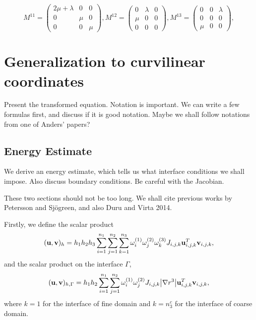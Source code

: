 \documentclass[a4paper]{article}
\begin{document}
\[ M^{11} = \left(\begin{array}{ccc}
2\mu+\lambda & 0 & 0\\
0 & \mu & 0\\
0 & 0 & \mu\end{array}\right), M^{12} = \left(\begin{array}{ccc}
0 & \lambda & 0\\
\mu & 0 & 0\\
0 & 0 & 0\end{array}\right), M^{13} = \left(\begin{array}{ccc}
0 & 0 & \lambda\\
0 & 0 & 0\\
\mu & 0 & 0\end{array}\right),\]


\section{Generalization to curvilinear coordinates}
Present the transformed equation. Notation is important. We can write a few formulas first, and discuss if it is good notation. Maybe we shall follow notations from one of Anders' papers?

\subsection{Energy Estimate}
We derive an energy estimate, which tells us what interface conditions we shall impose. Also discuss boundary conditions. Be careful with the Jacobian.

These two sections should not be too long. We shall cite previous works by Petersson and Sjögreen, and also Duru and Virta 2014. 

Firstly, we define the scalar product 
\begin{equation*}
({\bf u}, {\bf v})_h = h_1h_2h_3\sum_{i=1}^{n_1}\sum_{j=1}^{n_2}\sum_{k=1}^{n_3}\omega_i^{(1)}\omega_j^{(2)}\omega_k^{(3)}J_{i,j,k}{\bf u}^{T}_{i,j,k}{\bf v}_{i,j,k},
\end{equation*}
and the scalar product on the interface $\Gamma$,
\begin{equation*}
({\bf u}, {\bf v})_{h,\Gamma} = h_1h_2\sum_{i=1}^{n_1}\sum_{j=1}^{n_2}\omega_i^{(1)}\omega_j^{(2)}J_{i,j,k}\big|\nabla r^{3}\big|{\bf u}_{i,j,k}^{T}{\bf v}_{i,j,k},
\end{equation*}
where $k = 1$ for the interface of fine domain and $k = n_3^c$ for the interface of coarse domain.
\end{document}
